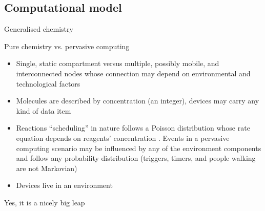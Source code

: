 \documentclass[presentation]{beamer}\mode<presentation>{\usetheme{sapere}}
\begin{document}
\subsection{Computational model}

\begin{frame}{Generalised chemistry}
\begin{block}{Pure chemistry vs. pervasive computing}
\begin{itemize}
 \item Single, static compartment versus multiple, possibly mobile, and interconnected nodes whose connection may depend on environmental and technological factors
 \item Molecules are described by concentration (an integer), devices may carry any kind of data item
 \item Reactions ``scheduling'' in nature follows a Poisson distribution whose rate equation depends on reagents' concentration \cite{gillespie1977}. Events in a pervasive computing scenario may be influenced by any of the environment components and follow any probability distribution (triggers, timers, and people walking are not Markovian)
 \item Devices live in an environment
\end{itemize}
\end{block}
Yes, it is a nicely big leap
\end{frame}

\end{document}
